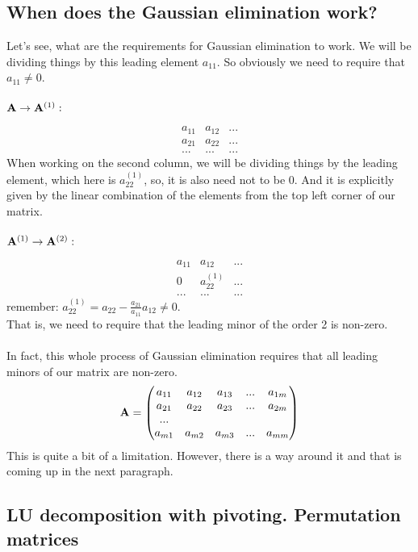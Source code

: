 \documentclass{article}
\begin{document}
\subsection{When does the Gaussian elimination work?}

Let's see, what are the requirements for Gaussian elimination to work. We will be dividing things by this leading element $a_{11}$. So obviously we need to require that \(a_{11} \neq 0\).\\
\\\({\bf A} \to {\bf A}^{(1)}:\)

\[
\begin{matrix}
a_{11} & a_{12} & ...\\
a_{21} & a_{22} & ...\\
... & ... & ...
\end{matrix}
\]
When working on the second column, we will be dividing things by the leading element, which here is $a_{22}^{(1)}$, so, it is also need not to be 0. And it is explicitly given by the linear combination of the elements from the top left corner of our matrix. \\
\\\({\bf A}^{(1)} \to {\bf A}^{(2)}:\)

\[
\begin{matrix}
a_{11} & a_{12} & ...\\
0 & a_{22}^{(1)} & ...\\
... & ... & ...
\end{matrix} 
\]
remember: \(a_{22}^{(1)} = a_{22} - \frac{a_{21}}{a_{11}}a_{12} \neq 0\).\\
That is, we need to require that the leading minor of the order 2 is non-zero.\\
\\In fact, this whole process of Gaussian elimination requires that all leading minors of our matrix are non-zero.
\[
{\bf A} = 
\begin{pmatrix}
    a_{11} & a_{12} & a_{13} & ... & a_{1m}\\
    a_{21} & a_{22} & a_{23} & ... & a_{2m}\\
    ...\\
    a_{m1} & a_{m2} & a_{m3} & ... & a_{mm}
\end{pmatrix}
\]
This is quite a bit of a limitation. However, there is a way around it and that is coming up in the next paragraph.

\subsection{LU decomposition with pivoting. Permutation matrices}
\end{document}
